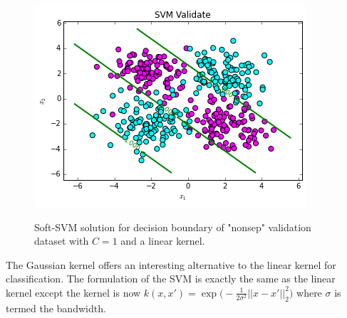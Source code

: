 \documentclass[10pt]{article}
\begin{document}
\begin{figure}
\centering
\includegraphics[scale=0.5]{svm_nonsep_val.png}
\label{svm_nonsep}
\caption{Soft-SVM solution for decision boundary of "nonsep" validation dataset with $C=1$ and a linear kernel.}
\end{figure}

The Gaussian kernel offers an interesting alternative to the linear kernel for classification.  The formulation of the SVM is exactly the same as the linear kernel except the kernel is now $k(x,x') = \exp\big( - \frac{1}{2 \sigma^2} ||x-x'||_2^2  \big)$
where $\sigma$ is termed the bandwidth.  %
\end{document}
